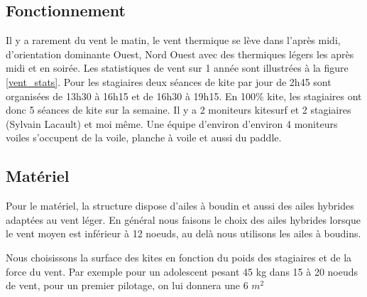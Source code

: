 \documentclass[11pt,a4paper]{report}
\begin{document}
\subsection{Fonctionnement}
Il y a rarement du vent le matin, le vent thermique se lève dans l'après midi,
d'orientation dominante Ouest, Nord Ouest avec des thermiques légers les après midi et 
en soirée. Les statistiques de vent sur 1 année sont illustrées à la figure \ref{vent_stats}.
Pour les stagiaires deux séances de kite par jour de 2h45 sont organisées de
13h30 à 16h15 et de 16h30 à 19h15. En 100\% kite, les stagiaires ont donc
5 séances de kite sur la semaine.
Il y a 2 moniteurs kitesurf et 2 stagiaires (Sylvain Lacault) et moi m\^eme.
Une équipe d'environ d'environ 4 moniteurs voiles s'occupent de la voile, 
planche à voile et aussi du paddle.

\subsection{Matériel}
Pour le matériel, la structure dispose d'ailes à boudin et aussi des ailes 
hybrides adaptées au vent léger. En général nous faisons le choix des ailes hybrides 
lorsque le vent moyen est inférieur à 12 noeuds, au delà nous utilisons
les ailes à boudins. 

Nous choisissons la surface des kites
en fonction du poids des stagiaires et de la force du vent.
Par exemple pour un adolescent pesant 45 kg dans 15 à 20 noeuds
de vent, pour un premier pilotage, on lui donnera une 6 $m^2$
\end{document}
